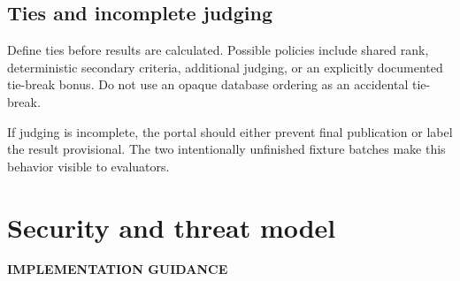 \documentclass[11pt]{article}
\newcommand{\advisory}{\textcolor{DeepBlue}{\textbf{IMPLEMENTATION GUIDANCE}}}
\begin{document}
\subsection{Ties and incomplete judging}

Define ties before results are calculated. Possible policies include shared rank, deterministic secondary criteria, additional judging, or an explicitly documented tie-break bonus. Do not use an opaque database ordering as an accidental tie-break.

If judging is incomplete, the portal should either prevent final publication or label the result provisional. The two intentionally unfinished fixture batches make this behavior visible to evaluators.

\section{Security and threat model}

\advisory\par
\end{document}
